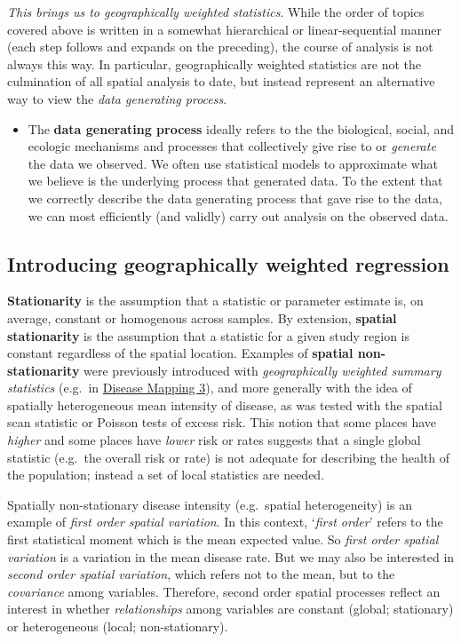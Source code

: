 \documentclass[
]{book}
\newenvironment{rmdblock}[1]
  {%
  \begin{itemize}
  \renewcommand{\labelitemi}{
    \raisebox{-.7\height}[0pt][0pt]{
      {\setkeys{Gin}{width=3em,keepaspectratio}\texttt{[image: images/\#1]}}
    }
  }
  \item
  }
  {
  \end{itemize}
  }
\newenvironment{rmdnote}
  {\begin{rmdblock}{note}}
  {\end{rmdblock}}
\begin{document}
\emph{This brings us to geographically weighted statistics}. While the order of topics covered above is written in a somewhat hierarchical or linear-sequential manner (each step follows and expands on the preceding), the course of analysis is not always this way. In particular, geographically weighted statistics are not the culmination of all spatial analysis to date, but instead represent an alternative way to view the \emph{data generating process}.

\begin{rmdnote}
The \textbf{data generating process} ideally refers to the the biological, social, and ecologic mechanisms and processes that collectively give rise to or \emph{generate} the data we observed. We often use statistical models to approximate what we believe is the underlying process that generated data. To the extent that we correctly describe the data generating process that gave rise to the data, we can most efficiently (and validly) carry out analysis on the observed data.
\end{rmdnote}

\hypertarget{introducing-geographically-weighted-regression}{%
\subsection{Introducing geographically weighted regression}\label{introducing-geographically-weighted-regression}}

\textbf{Stationarity} is the assumption that a statistic or parameter estimate is, on average, constant or homogenous across samples. By extension, \textbf{spatial stationarity} is the assumption that a statistic for a given study region is constant regardless of the spatial location. Examples of \textbf{spatial non-stationarity} were previously introduced with \emph{geographically weighted summary statistics} (e.g.~in \protect\hyperlink{gwss}{Disease Mapping 3}), and more generally with the idea of spatially heterogeneous mean intensity of disease, as was tested with the spatial scan statistic or Poisson tests of excess risk. This notion that some places have \emph{higher} and some places have \emph{lower} risk or rates suggests that a single global statistic (e.g.~the overall risk or rate) is not adequate for describing the health of the population; instead a set of local statistics are needed.

Spatially non-stationary disease intensity (e.g.~spatial heterogeneity) is an example of \emph{first order spatial variation}. In this context, `\emph{first order}' refers to the first statistical moment which is the mean expected value. So \emph{first order spatial variation} is a variation in the mean disease rate. But we may also be interested in \emph{second order spatial variation}, which refers not to the mean, but to the \emph{covariance} among variables. Therefore, second order spatial processes reflect an interest in whether \emph{relationships} among variables are constant (global; stationary) or heterogeneous (local; non-stationary).
\end{document}
